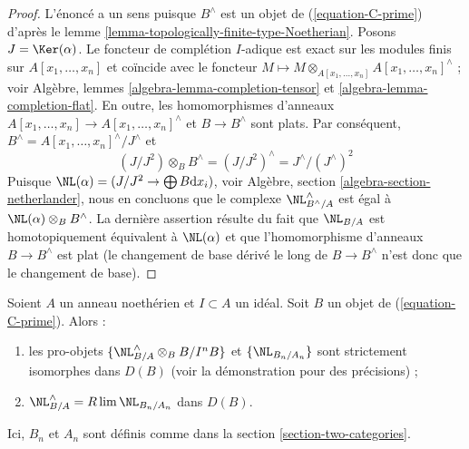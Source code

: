 \begin{proof}
L'énoncé a un sens puisque $B^\wedge$ est un objet de
(\ref{equation-C-prime}) d'après le lemme
\ref{lemma-topologically-finite-type-Noetherian}. Posons
$J = \Ker(\alpha)$. Le foncteur de complétion $I$-adique est exact sur les
modules finis sur $A[x_1, \ldots, x_n]$ et coïncide avec le foncteur
$M \mapsto M \otimes_{A[x_1, \ldots, x_n]} A[x_1, \ldots, x_n]^\wedge$ ;
voir Algèbre, lemmes \ref{algebra-lemma-completion-tensor} et
\ref{algebra-lemma-completion-flat}. En outre, les homomorphismes d'anneaux
$A[x_1, \ldots, x_n] \to A[x_1, \ldots, x_n]^\wedge$
et $B \to B^\wedge$ sont plats. Par conséquent,
$B^\wedge = A[x_1, \ldots, x_n]^\wedge / J^\wedge$ et
$$
(J/J^2) \otimes_B B^\wedge = (J/J^2)^\wedge = J^\wedge/(J^\wedge)^2
$$
Puisque $\NL(\alpha) = (J/J^2 \to \bigoplus B\text{d}x_i)$, voir Algèbre,
section \ref{algebra-section-netherlander}, nous en concluons que le complexe
$\NL_{B^\wedge/A}^\wedge$ est égal à
$\NL(\alpha) \otimes_B B^\wedge$. La dernière assertion résulte du fait que
$\NL_{B/A}$ est homotopiquement équivalent à $\NL(\alpha)$ et que
l'homomorphisme d'anneaux $B \to B^\wedge$ est plat (le changement de base
dérivé le long de $B \to B^\wedge$ n'est donc que le changement de base).
\end{proof}

\begin{lemma}
\label{lemma-NL-is-limit}
Soient $A$ un anneau noethérien et $I \subset A$ un idéal. Soit $B$ un objet
de (\ref{equation-C-prime}). Alors :
\begin{enumerate}
\item les pro-objets
$\{\NL_{B/A}^\wedge \otimes_B B/I^nB\}$ et $\{\NL_{B_n/A_n}\}$
sont strictement isomorphes dans $D(B)$ (voir la démonstration pour des
précisions) ;
\item $\NL_{B/A}^\wedge = R\lim \NL_{B_n/A_n}$ dans $D(B)$.
\end{enumerate}
Ici, $B_n$ et $A_n$ sont définis comme dans la section
\ref{section-two-categories}.
\end{lemma}

